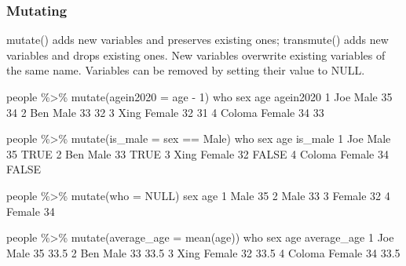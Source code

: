 \documentclass[
]{book}
\newenvironment{Shaded}{\begin{snugshade}}{\end{snugshade}}
\newcommand{\AttributeTok}[1]{\textcolor[rgb]{0.77,0.63,0.00}{#1}}
\newcommand{\ConstantTok}[1]{\textcolor[rgb]{0.00,0.00,0.00}{#1}}
\newcommand{\DecValTok}[1]{\textcolor[rgb]{0.00,0.00,0.81}{#1}}
\newcommand{\FloatTok}[1]{\textcolor[rgb]{0.00,0.00,0.81}{#1}}
\newcommand{\FunctionTok}[1]{\textcolor[rgb]{0.00,0.00,0.00}{#1}}
\newcommand{\NormalTok}[1]{#1}
\newcommand{\SpecialCharTok}[1]{\textcolor[rgb]{0.00,0.00,0.00}{#1}}
\newcommand{\StringTok}[1]{\textcolor[rgb]{0.31,0.60,0.02}{#1}}
\begin{document}
\hypertarget{mutating}{%
\subsubsection*{Mutating}\label{mutating}}

mutate() adds new variables and preserves existing ones; transmute() adds new variables and drops existing ones. New variables overwrite existing variables of the same name. Variables can be removed by setting their value to NULL.

\begin{Shaded}
\begin{Highlighting}[]
\NormalTok{people }\SpecialCharTok{\%\textgreater{}\%} \FunctionTok{mutate}\NormalTok{(}\AttributeTok{agein2020 =}\NormalTok{ age }\SpecialCharTok{{-}} \DecValTok{1}\NormalTok{)}
\NormalTok{     who    sex age agein2020}
\DecValTok{1}\NormalTok{    Joe   Male  }\DecValTok{35}        \DecValTok{34}
\DecValTok{2}\NormalTok{    Ben   Male  }\DecValTok{33}        \DecValTok{32}
\DecValTok{3}\NormalTok{   Xing Female  }\DecValTok{32}        \DecValTok{31}
\DecValTok{4}\NormalTok{ Coloma Female  }\DecValTok{34}        \DecValTok{33}

\NormalTok{people }\SpecialCharTok{\%\textgreater{}\%} \FunctionTok{mutate}\NormalTok{(}\AttributeTok{is\_male =}\NormalTok{ sex }\SpecialCharTok{==} \StringTok{\textquotesingle{}Male\textquotesingle{}}\NormalTok{)}
\NormalTok{     who    sex age is\_male}
\DecValTok{1}\NormalTok{    Joe   Male  }\DecValTok{35}    \ConstantTok{TRUE}
\DecValTok{2}\NormalTok{    Ben   Male  }\DecValTok{33}    \ConstantTok{TRUE}
\DecValTok{3}\NormalTok{   Xing Female  }\DecValTok{32}   \ConstantTok{FALSE}
\DecValTok{4}\NormalTok{ Coloma Female  }\DecValTok{34}   \ConstantTok{FALSE}

\NormalTok{people }\SpecialCharTok{\%\textgreater{}\%} \FunctionTok{mutate}\NormalTok{(}\AttributeTok{who =} \ConstantTok{NULL}\NormalTok{)}
\NormalTok{     sex age}
\DecValTok{1}\NormalTok{   Male  }\DecValTok{35}
\DecValTok{2}\NormalTok{   Male  }\DecValTok{33}
\DecValTok{3}\NormalTok{ Female  }\DecValTok{32}
\DecValTok{4}\NormalTok{ Female  }\DecValTok{34}

\NormalTok{people }\SpecialCharTok{\%\textgreater{}\%} \FunctionTok{mutate}\NormalTok{(}\AttributeTok{average\_age =} \FunctionTok{mean}\NormalTok{(age))}
\NormalTok{     who    sex age average\_age}
\DecValTok{1}\NormalTok{    Joe   Male  }\DecValTok{35}        \FloatTok{33.5}
\DecValTok{2}\NormalTok{    Ben   Male  }\DecValTok{33}        \FloatTok{33.5}
\DecValTok{3}\NormalTok{   Xing Female  }\DecValTok{32}        \FloatTok{33.5}
\DecValTok{4}\NormalTok{ Coloma Female  }\DecValTok{34}        \FloatTok{33.5}


\end{Highlighting}
\end{Shaded}
\end{document}
